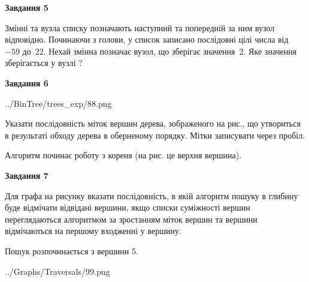 \documentclass[12pt, ukrainian]{article}
\begin{document}
{\begin {large}
{\begin {center}\textbf{Завдання 5}\end {center}}\par
Змінні  та  вузла списку позначають наступний та попередній за ним вузол відповідно. Починаючи з голови, у список записано послідовні цілі числа від~$-59$ до~$22$. Нехай змінна  позначає вузол, що зберігає значення~$2$.
Яке значення зберігається у вузлі  ?\par
\newpage

{\begin {center}\textbf{Завдання 6}\end {center}}\par

\begin{center}
	{../BinTree/trees_exp/88.png}
\end{center}
Указати послідовність міток вершин дерева, зображеного на рис., що утвориться в результаті обходу дерева в оберненому порядку. Мітки записувати через пробіл.\par Алгоритм починає роботу з кореня (на рис. це верхня вершина).\par
\newpage

{\begin {center}\textbf{Завдання 7}\end {center}}\par
Для графа на рисунку вказати послідовність, в якій алгоритм пошуку в глибину буде відмічати відвідані вершини, якщо списки суміжності вершин переглядаються алгоритмом за зростанням міток вершин та вершини відмічаються на першому вход\-женні у вершину.\par
Пошук розпочинається з вершини 5.\par

\begin{center}
	{../Graphs/Traversals/99.png}
\end{center}\par
\newpage


\end{large}}
\end{document}
